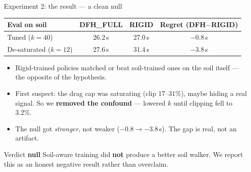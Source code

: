 \documentclass[aspectratio=169,10pt]{beamer}
\newcommand{\no}{\textcolor{bad}{\textbf{null}}}
\begin{document}
\begin{frame}{Experiment 2: the result --- a clean null}
  \begin{center}
  \begin{tabular}{lccc}
    \toprule
    Eval on soil & DFH\_FULL & RIGID & Regret (DFH$-$RIGID) \\
    \midrule
    Tuned ($k{=}40$)     & 26.2\,s & 27.0\,s & \textcolor{bad}{$-0.8$\,s} \\
    De-saturated ($k{=}12$) & 27.6\,s & 31.4\,s & \textcolor{bad}{$-3.8$\,s} \\
    \bottomrule
  \end{tabular}
  \end{center}

  \vspace{0.8em}
  \begin{itemize}
    \item Rigid-trained policies \alert{matched or beat} soil-trained ones on the
          soil itself --- the opposite of the hypothesis.
    \item First suspect: the drag cap was saturating (clip 17--31\%), maybe hiding
          a real signal. So we \textbf{removed the confound} --- lowered $k$ until
          clipping fell to 3.2\%.
    \item The null got \emph{stronger}, not weaker ($-0.8 \rightarrow -3.8$\,s).
          The gap is real, not an artifact.
  \end{itemize}

  \vspace{0.4em}
  \begin{block}{Verdict \no}
    Soil-aware training did \textbf{not} produce a better soil walker.
    We report this as an honest negative result rather than overclaim.
  \end{block}
\end{frame}
\end{document}

